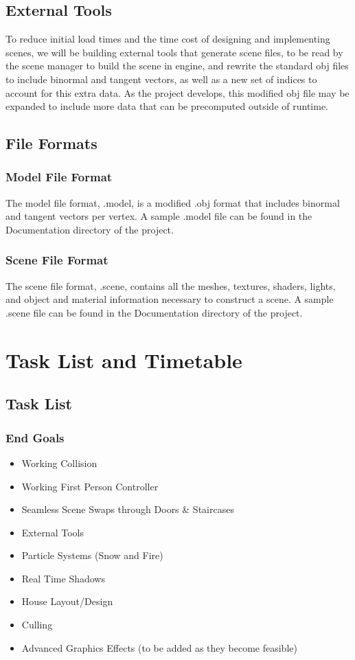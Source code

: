 \documentclass[11pt]{article} %
\begin{document}
\subsection{External Tools}
\par To reduce initial load times and the time cost of designing and implementing scenes, we will
 be building external tools that generate scene files, to be read by the scene manager to build the scene in engine, and rewrite the standard obj files to include binormal and tangent vectors, as well as a new set of indices to account for this extra data. As the project develops, this modified obj file may be expanded to include more data that can be precomputed outside of runtime.
\subsection{File Formats}

\subsubsection{Model File Format}
The model file format, .model, is a modified .obj format that includes binormal and tangent vectors per vertex. A sample .model file can be found in the Documentation directory of the project.
\subsubsection{Scene File Format}
The scene file format, .scene, contains all the meshes, textures, shaders, lights, and object and material information necessary to construct a scene. A sample .scene file can be found in the Documentation directory of the project.

\section{ Task List and Timetable}

\subsection{Task List}
\subsubsection*{End Goals}
\begin{itemize}
\item Working Collision
\item Working First Person Controller
\item Seamless Scene Swaps through Doors \& Staircases
\item External Tools
\item Particle Systems (Snow and Fire)
\item Real Time Shadows
\item House Layout/Design
\item Culling
\item Advanced Graphics Effects (to be added as they become feasible)
\end{itemize}
\end{document}
